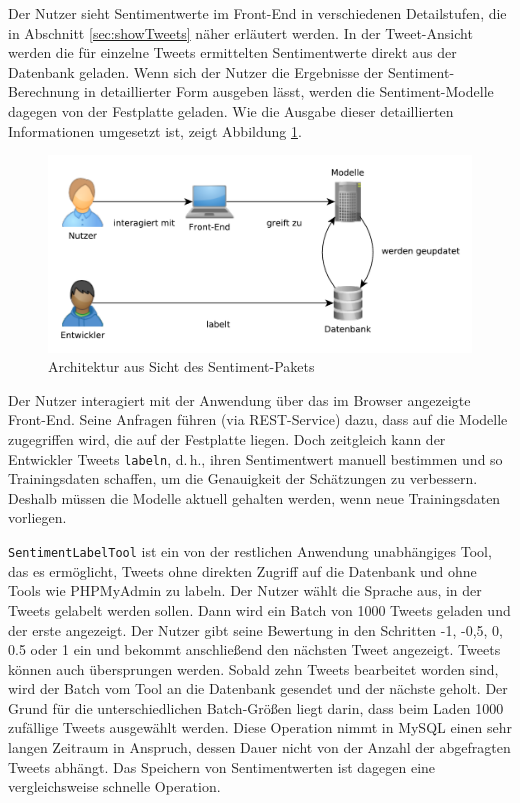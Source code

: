 Der Nutzer sieht Sentimentwerte im Front-End in verschiedenen Detailstufen, die in Abschnitt \ref{sec:showTweets} näher erläutert werden. In der Tweet-Ansicht werden die für einzelne Tweets ermittelten Sentimentwerte direkt aus der Datenbank geladen. Wenn sich der Nutzer die Ergebnisse der Sentiment-Berechnung in detaillierter Form ausgeben lässt, werden die Sentiment-Modelle dagegen von der Festplatte geladen. Wie die Ausgabe dieser detaillierten Informationen umgesetzt ist, zeigt Abbildung \ref{sentimentdetailarchitecture}.

\begin{figure}
 \centering
  \centering
    \includegraphics[width=\textwidth]{./Bilder/Sentiment/sentiment-architektur.pdf}
  \caption{Architektur aus Sicht des Sentiment-Pakets}
  \label{sentimentdetailarchitecture}
\end{figure}

Der Nutzer interagiert mit der Anwendung über das im Browser angezeigte Front-End. Seine Anfragen führen (via REST-Service) dazu, dass auf die Modelle zugegriffen wird, die auf der Festplatte liegen. Doch zeitgleich kann der Entwickler Tweets \texttt{labeln}, d.\,h., ihren Sentimentwert manuell bestimmen und so Trainingsdaten schaffen, um die Genauigkeit der Schätzungen zu verbessern. Deshalb müssen die Modelle aktuell gehalten werden, wenn neue Trainingsdaten vorliegen.

\texttt{Sentiment\-Label\-Tool} ist ein von der restlichen Anwendung unabhängiges Tool, das es ermöglicht, Tweets ohne direkten Zugriff auf die Datenbank und ohne Tools wie PHPMyAdmin zu labeln. Der Nutzer wählt die Sprache aus, in der Tweets gelabelt werden sollen. Dann wird ein Batch von 1000 Tweets geladen und der erste angezeigt. Der Nutzer gibt seine Bewertung in den Schritten -1, -0,5, 0, 0.5 oder 1 ein und bekommt anschließend den nächsten Tweet angezeigt. Tweets können auch übersprungen werden. Sobald zehn Tweets bearbeitet worden sind, wird der Batch vom Tool an die Datenbank gesendet und der nächste geholt. Der Grund für die unterschiedlichen Batch-Größen liegt darin, dass beim Laden 1000 zufällige Tweets ausgewählt werden. Diese Operation nimmt in MySQL einen sehr langen Zeitraum in Anspruch, dessen Dauer nicht von der Anzahl der abgefragten Tweets abhängt. Das Speichern von Sentimentwerten ist dagegen eine vergleichsweise schnelle Operation.

